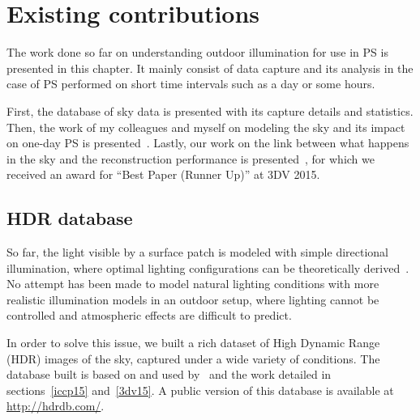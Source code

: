 
\chapter{Existing contributions}
\label{ch:existing}

The work done so far on understanding outdoor illumination for use in PS is presented in this chapter. It mainly consist of data capture and its analysis in the case of PS performed on short time intervals such as a day or some hours.

First, the database of sky data is presented with its capture details and statistics. Then, the work of my colleagues and myself on modeling the sky and its impact on one-day PS is presented~\cite{holdgeoffroy-iccp-15}. Lastly, our work on the link between what happens in the sky and the reconstruction performance is presented~\cite{holdgeoffroy-3dv-15}, for which we received an award for ``Best Paper (Runner Up)'' at 3DV 2015.

\section{HDR database}
\label{sec:hdrdb}

So far, the light visible by a surface patch is modeled with simple directional illumination, where optimal lighting configurations can be theoretically derived~\cite{drbohlav-iccv-05,klaudiny-prl-14,shen-pg-14}. No attempt has been made to model natural lighting conditions with more realistic illumination models in an outdoor setup, where lighting cannot be controlled and atmospheric effects are difficult to predict.

In order to solve this issue, we built a rich dataset of High Dynamic Range (HDR) images of the sky, captured under a wide variety of conditions. The database built is based on and used by~\cite{lalonde-3dv-14} and the work detailed in sections~\ref{iccp15} and~\ref{3dv15}. A public version of this database is available at \url{http://hdrdb.com/}.

